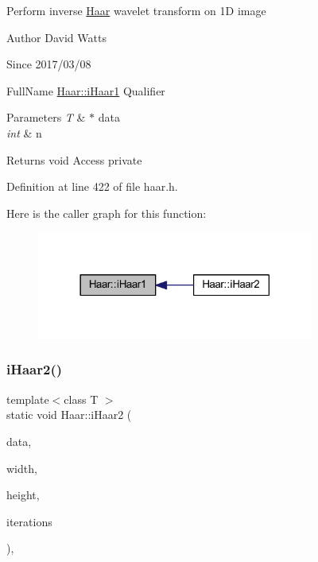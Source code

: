 Perform inverse \hyperlink{class_haar}{Haar} wavelet transform on 1D image

\begin{DoxyAuthor}{Author}
David Watts 
\end{DoxyAuthor}
\begin{DoxySince}{Since}
2017/03/08
\end{DoxySince}
Full\+Name \hyperlink{class_haar_aedd7102138b5f942b7fbd539b1ff8143}{Haar\+::i\+Haar1} Qualifier 
\begin{DoxyParams}{Parameters}
{\em T} & $\ast$ data \\
\hline
{\em int} & n \\
\hline
\end{DoxyParams}
\begin{DoxyReturn}{Returns}
void Access private 
\end{DoxyReturn}


Definition at line 422 of file haar.\+h.

Here is the caller graph for this function\+:
\nopagebreak
\begin{figure}[H]
\begin{center}
\leavevmode
\includegraphics[width=258pt]{class_haar_aedd7102138b5f942b7fbd539b1ff8143_icgraph}
\end{center}
\end{figure}
\mbox{\label{class_haar_ab2c372ee9f5eec084066ba52de18fbbe}} 
\subsubsection{\texorpdfstring{i\+Haar2()}{iHaar2()}\hspace{0.1cm}{\footnotesize\ttfamily [1/2]}}
{\footnotesize\ttfamily template$<$class T $>$ \\
static void Haar\+::i\+Haar2 (\begin{DoxyParamCaption}\item[{T $\ast$}]{data,  }\item[{int}]{width,  }\item[{int}]{height,  }\item[{int}]{iterations }\end{DoxyParamCaption})\hspace{0.3cm}{\ttfamily [inline]}, {\ttfamily [static]}}

